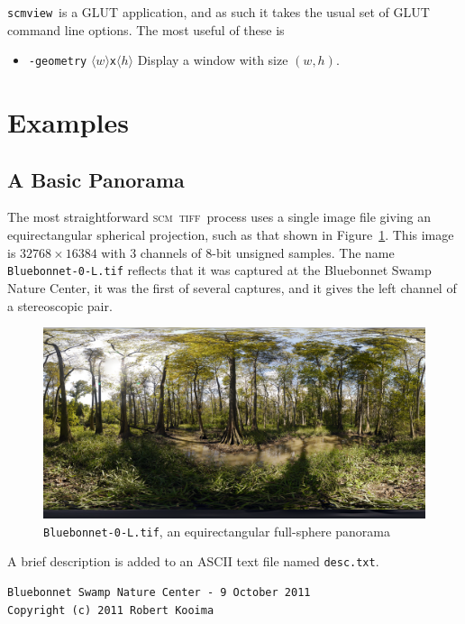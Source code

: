 \documentclass[oneside,10pt]{memoir}
\newcommand{\scm}     {\textsc{scm}}
\newcommand{\tiff}    {\textsc{tiff}}
\newcommand{\scmview} {\texttt{scmview}}
\newcommand{\inangles}[1]{$\langle$#1$\rangle$}
\newenvironment{optionlist}
  {\setlength{\leftmargini}{1in}\begin{itemize}}{\end{itemize}}
\begin{document}
\begin{Spacing}{1.1}
\scmview\ is a \textsc{GLUT} application, and as such it takes the usual set of \textsc{GLUT} command line options. The most useful of these is

\begin{optionlist}
\item[\texttt{-geometry} \inangles{$w$}\texttt{x}\inangles{$h$}] Display a window with size $(w, h)$.
\end{optionlist}

\section{Examples}

\subsection{A Basic Panorama}
\label{sec:panorama}

The most straightforward \scm\ \tiff\ process uses a single image file giving an equirectangular spherical projection, such as that shown in Figure~\ref{fig:bluebonnet}. This image is $\num{32768}\times\num{16384}$ with 3 channels of 8-bit unsigned samples. The name \texttt{Bluebonnet-0-L.tif} reflects that it was captured at the Bluebonnet Swamp Nature Center, it was the first of several captures, and it gives the left channel of a stereoscopic pair.

\begin{figure}
  \centering
  \includegraphics[width=\textwidth]{fig/bluebonnet.png}
  \caption{\texttt{Bluebonnet-0-L.tif}, an equirectangular full-sphere panorama}
  \label{fig:bluebonnet}
\end{figure}

A brief description is added to an ASCII text file named \texttt{desc.txt}.

\begin{Verbatim}
Bluebonnet Swamp Nature Center - 9 October 2011
Copyright (c) 2011 Robert Kooima
\end{Verbatim}


\end{Spacing}
\end{document}
